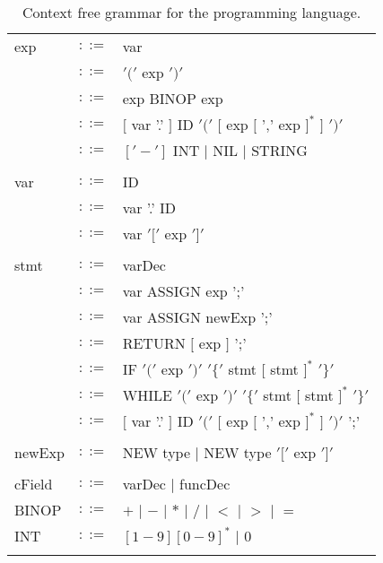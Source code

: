 \documentclass{article}
\begin{document}
\begin{table}[h]
\begin{tabular}{ l c l }
exp      & $::=$ & var                                                            \\
         & $::=$ & $'('$ exp $')'$                                                \\
         & $::=$ & exp BINOP exp                                                  \\
         & $::=$ & $[$ var '.' $]$ ID $'('$ $[$ exp $[$ ',' exp $]^{*}$ $]$ $')'$ \\
         & $::=$ & $['-']$ INT $|$ NIL $|$ STRING                                 \\
\\
var      & $::=$ & ID                  \\
         & $::=$ & var '.' ID          \\
         & $::=$ & var $'['$ exp $']'$ \\
\\  
stmt     & $::=$ & varDec                                                             \\
         & $::=$ & var ASSIGN exp ';'                                                 \\
         & $::=$ & var ASSIGN newExp ';'                                              \\
         & $::=$ & RETURN $[$ exp $]$ ';'                                             \\
         & $::=$ & IF $'('$ exp $')'$ $'\{'$ stmt $[$ stmt $]^{*}$ $'\}'$             \\
         & $::=$ & WHILE $'('$ exp $')'$ $'\{'$ stmt $[$ stmt $]^{*}$ $'\}'$          \\
         & $::=$ & $[$ var '.' $]$ ID $'('$ $[$ exp $[$ ',' exp $]^{*}$ $]$ $')'$ ';' \\
\\
newExp   & $::=$ & NEW type $|$ NEW type $'['$ exp $']'$ \\
\\
cField   & $::=$ & varDec $|$ funcDec \\
BINOP    & $::=$ & $+$ $|$ $-$ $|$ $*$ $|$ $/$ $|$ $<$ $|$ $>$ $|$ $=$ \\
INT      & $::=$ & $[1-9][0-9]^{*}$ $|$ $0$                            \\
\\
\end{tabular}
\caption{
Context free grammar for the \plname programming language.
\label{Table_CFG}}
\end{table}
\end{document}
